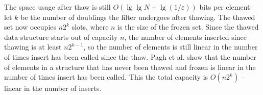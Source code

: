 \documentclass[sigconf, nonacm]{acmart}
\newcommand{\ints}{\mathbb{Z}}
\newcommand{\dotcup}{\ensuremath{\mathaccent\cdot\cup}}
\newcommand{\etal}{et al.}
\begin{document}
The space usage after thaw is still $O(\lg \lg N + \lg (1/\varepsilon))$ bits per element:
let $k$ be the number of doublings the filter undergoes after thawing.
The thawed set now occupies $n2^k$ slots, where $n$ is the size of the frozen set.
Since the thawed data structure starts out of capacity $n$, the number of elements inserted since thawing is at least $n2^{k-1}$, so the number of elements is still linear in the number of times insert has been called since the thaw.
Pagh \etal{} show that the number of elements in a structure that has never been thawed and frozen is linear in the number of times insert has been called.
This the total capacity is $O(n2^k)$ -- linear in the number of inserts.






\end{document}
